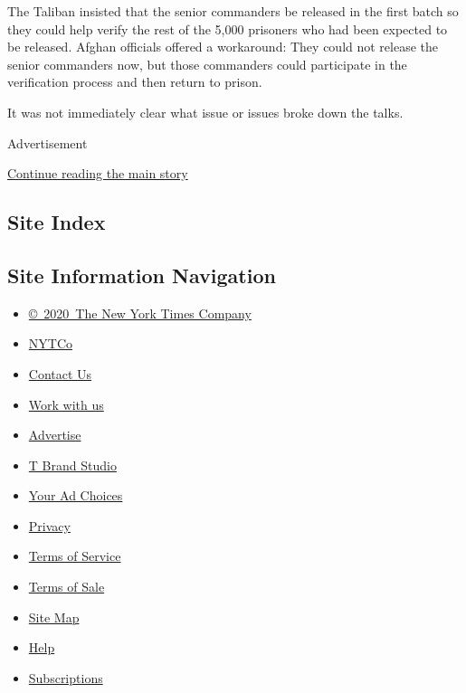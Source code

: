 The Taliban insisted that the senior commanders be released in the first
batch so they could help verify the rest of the 5,000 prisoners who had
been expected to be released. Afghan officials offered a workaround:
They could not release the senior commanders now, but those commanders
could participate in the verification process and then return to prison.

It was not immediately clear what issue or issues broke down the talks.

Advertisement

\protect\hyperlink{after-bottom}{Continue reading the main story}

\hypertarget{site-index}{%
\subsection{Site Index}\label{site-index}}

\hypertarget{site-information-navigation}{%
\subsection{Site Information
Navigation}\label{site-information-navigation}}

\begin{itemize}
\tightlist
\item
  \href{https://help.nytimes.com/hc/en-us/articles/115014792127-Copyright-notice}{©~2020~The
  New York Times Company}
\end{itemize}

\begin{itemize}
\tightlist
\item
  \href{https://www.nytco.com/}{NYTCo}
\item
  \href{https://help.nytimes.com/hc/en-us/articles/115015385887-Contact-Us}{Contact
  Us}
\item
  \href{https://www.nytco.com/careers/}{Work with us}
\item
  \href{https://nytmediakit.com/}{Advertise}
\item
  \href{http://www.tbrandstudio.com/}{T Brand Studio}
\item
  \href{https://www.nytimes.com/privacy/cookie-policy\#how-do-i-manage-trackers}{Your
  Ad Choices}
\item
  \href{https://www.nytimes.com/privacy}{Privacy}
\item
  \href{https://help.nytimes.com/hc/en-us/articles/115014893428-Terms-of-service}{Terms
  of Service}
\item
  \href{https://help.nytimes.com/hc/en-us/articles/115014893968-Terms-of-sale}{Terms
  of Sale}
\item
  \href{https://spiderbites.nytimes.com}{Site Map}
\item
  \href{https://help.nytimes.com/hc/en-us}{Help}
\item
  \href{https://www.nytimes.com/subscription?campaignId=37WXW}{Subscriptions}
\end{itemize}
